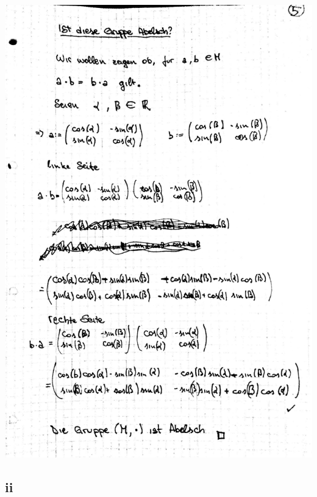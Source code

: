 \documentclass[12pt,a4paper]{article}
\begin{document}
\includegraphics[scale=0.2]{lat4e_5.jpg} 

\newpage
\subsection{ii}
\end{document}
